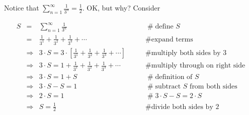 \documentclass[11pt, oneside]{article}   	%
\begin{document}
Notice that  $\sum\limits_{n = 1}^\infty \frac{1}{3^n}  = \frac{1}{2}$. OK, but why? Consider 
      
\begin{equation*}
\begin{array}{lllll}
S
&=& \sum\limits_{n = 1}^\infty \frac{1}{3^n}                                                                            &\qquad  \mathrel{\#} \text{define $S$}                                \\ 
&=& \frac{1}{3^1} + \frac{1}{3^2} + \frac{1}{3^3} + \cdots                                                       &\qquad  \mathrel{\#} \text{expand terms}                           \\
&\Rightarrow& 3 \cdot S = 3 \cdot [\frac{1}{3^1} + \frac{1}{3^2} + \frac{1}{3^3} + \cdots ]      &\qquad  \mathrel{\#} \text{multiply both sides by 3}           \\
&\Rightarrow& 3 \cdot S = 1 + \frac{1}{3^1} + \frac{1}{3^2} + \frac{1}{3^3} + \cdots               &\qquad  \mathrel{\#} \text{multiply through on right side}  \\
&\Rightarrow& 3 \cdot S = 1 + S                                                                                             &\qquad  \mathrel{\#} \text{definition of $S$}                      \\
&\Rightarrow& 3 \cdot S - S = 1                                                                                              &\qquad  \mathrel{\#} \text{subtract $S$ from both sides}  \\
&\Rightarrow& 2 \cdot S  = 1                                                                                                  &\qquad  \mathrel{\#} 3 \cdot S - S = 2 \cdot S                    \\
&\Rightarrow& S  = \frac{1}{2}                                                                                                &\qquad  \mathrel{\#} \text{divide both sides by 2} 
\end{array}
\end{equation*}
\end{document}

